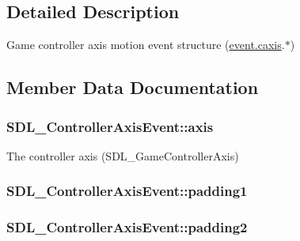 \subsection{Detailed Description}
Game controller axis motion event structure (\hyperlink{union_s_d_l___event_aa8f6df0f2716fae56204b12ab4a4c289}{event.\+caxis}.$\ast$) 

\subsection{Member Data Documentation}
\subsubsection[{\texorpdfstring{axis}{axis}}]{ S\+D\+L\+\_\+\+Controller\+Axis\+Event\+::axis}\hypertarget{struct_s_d_l___controller_axis_event_aba6543c143521aebce06a41a8cf79db0}{}\label{struct_s_d_l___controller_axis_event_aba6543c143521aebce06a41a8cf79db0}
The controller axis (S\+D\+L\+\_\+\+Game\+Controller\+Axis) 
\subsubsection[{\texorpdfstring{padding1}{padding1}}]{ S\+D\+L\+\_\+\+Controller\+Axis\+Event\+::padding1}\hypertarget{struct_s_d_l___controller_axis_event_af980495b1e24f9a868f2ccb25ce9629b}{}\label{struct_s_d_l___controller_axis_event_af980495b1e24f9a868f2ccb25ce9629b}
\subsubsection[{\texorpdfstring{padding2}{padding2}}]{ S\+D\+L\+\_\+\+Controller\+Axis\+Event\+::padding2}\hypertarget{struct_s_d_l___controller_axis_event_a4a04fcd20a54db21c5258ab0e40c6ab5}{}\label{struct_s_d_l___controller_axis_event_a4a04fcd20a54db21c5258ab0e40c6ab5}
